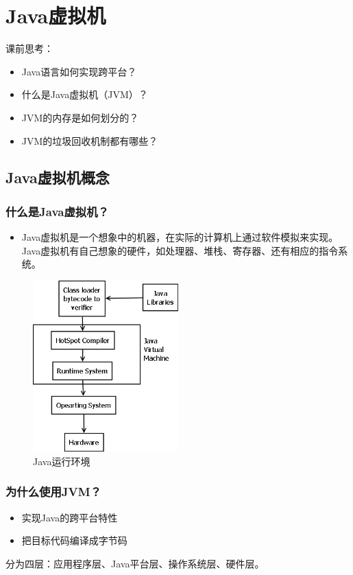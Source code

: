 \chapter{Java虚拟机}
课前思考：
\begin{itemize}
	\item Java语言如何实现跨平台？
	\item 什么是Java虚拟机（JVM）？
	\item JVM的内存是如何划分的？
	\item JVM的垃圾回收机制都有哪些？
\end{itemize}
\section{Java虚拟机概念}
\subsection{什么是Java虚拟机？}
\begin{itemize}
	\item Java虚拟机是一个想象中的机器，在实际的计算机上通过软件模拟来实现。
	Java虚拟机有自己想象的硬件，如处理器、堆栈、寄存器、还有相应的指令系统。
\end{itemize}
\begin{figure}[!h]
	\centering
	\includegraphics[width=0.5\textwidth]{image/JVM.png}
	\caption{Java运行环境}
\end{figure}
\subsection{为什么使用JVM？}
\begin{itemize}
	\item 实现Java的跨平台特性
	\item 把目标代码编译成字节码
\end{itemize}
\par 分为四层：应用程序层、Java平台层、操作系统层、硬件层。
